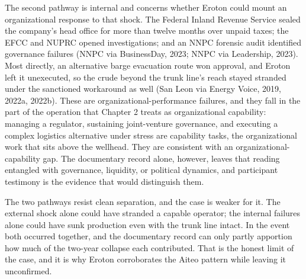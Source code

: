 \documentclass[twoside,fontset=lmodern]{mitthesis}
\begin{document}
The second pathway is internal and concerns whether Eroton could mount
an organizational response to that shock. The Federal Inland Revenue
Service sealed the company's head office for more than twelve months
over unpaid taxes; the EFCC and NUPRC opened investigations; and an NNPC
forensic audit identified governance failures (NNPC via BusinessDay,
2023; NNPC via Leadership, 2023). Most directly, an alternative barge
evacuation route won approval, and Eroton left it unexecuted, so the
crude beyond the trunk line's reach stayed stranded under the sanctioned
workaround as well (San Leon via Energy Voice, 2019, 2022a, 2022b).
These are organizational-performance failures, and they fall in the part
of the operation that Chapter 2 treats as organizational capability:
managing a regulator, sustaining joint-venture governance, and executing
a complex logistics alternative under stress are capability tasks, the
organizational work that sits above the wellhead. They are consistent
with an organizational-capability gap. The documentary record alone,
however, leaves that reading entangled with governance, liquidity, or
political dynamics, and participant testimony is the evidence that would
distinguish them.

The two pathways resist clean separation, and the case is weaker for it.
The external shock alone could have stranded a capable operator; the
internal failures alone could have sunk production even with the trunk
line intact. In the event both occurred together, and the documentary
record can only partly apportion how much of the two-year collapse each
contributed. That is the honest limit of the case, and it is why Eroton
corroborates the Aiteo pattern while leaving it unconfirmed.
\end{document}
